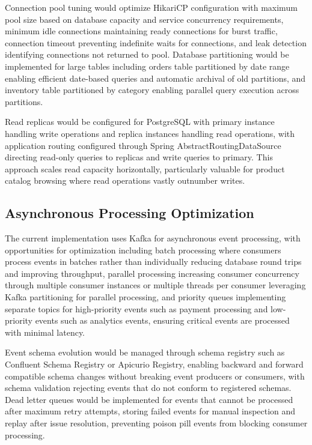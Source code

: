 Connection pool tuning would optimize HikariCP configuration with maximum pool size based on database capacity and service concurrency requirements, minimum idle connections maintaining ready connections for burst traffic, connection timeout preventing indefinite waits for connections, and leak detection identifying connections not returned to pool. Database partitioning would be implemented for large tables including orders table partitioned by date range enabling efficient date-based queries and automatic archival of old partitions, and inventory table partitioned by category enabling parallel query execution across partitions.

Read replicas would be configured for PostgreSQL with primary instance handling write operations and replica instances handling read operations, with application routing configured through Spring AbstractRoutingDataSource directing read-only queries to replicas and write queries to primary. This approach scales read capacity horizontally, particularly valuable for product catalog browsing where read operations vastly outnumber writes.

\subsection{Asynchronous Processing Optimization}

The current implementation uses Kafka for asynchronous event processing, with opportunities for optimization including batch processing where consumers process events in batches rather than individually reducing database round trips and improving throughput, parallel processing increasing consumer concurrency through multiple consumer instances or multiple threads per consumer leveraging Kafka partitioning for parallel processing, and priority queues implementing separate topics for high-priority events such as payment processing and low-priority events such as analytics events, ensuring critical events are processed with minimal latency.

Event schema evolution would be managed through schema registry such as Confluent Schema Registry or Apicurio Registry, enabling backward and forward compatible schema changes without breaking event producers or consumers, with schema validation rejecting events that do not conform to registered schemas. Dead letter queues would be implemented for events that cannot be processed after maximum retry attempts, storing failed events for manual inspection and replay after issue resolution, preventing poison pill events from blocking consumer processing.


